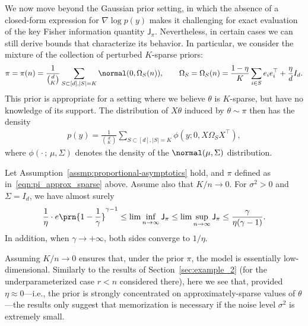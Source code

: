 \documentclass[11pt]{article}
\newcommand{\jfunc}{\mathsf{J}}
\begin{document}
We now move beyond the Gaussian prior setting, in which the absence of a closed-form expression for $\nabla \log p(y)$ makes it challenging for exact evaluation of the key Fisher information quantity $\jfunc_\pi$. Nevertheless, in certain cases we can still derive bounds that characterize its behavior. In particular, we consider the mixture of the collection of perturbed $K$-sparse priors:
\begin{align}\label{eqn:pi_approx_sparse}
    \pi = \pi(n) = \frac{1}{\binom{d}{K}} \sum_{S \subset [d], |S|=K} \normal(0, \Omega_S(n)), \qquad \Omega_S = \Omega_S(n) = \frac{1-\eta}{K}\sum_{i \in S} e_ie_i^\top + \frac{\eta}{d} I_d.
\end{align}
This prior is appropriate for a setting where we believe $\theta$ is $K$-sparse, but have no knowledge of its support. The distribution of $X\theta$ induced by $\theta \sim \pi$ then has the density
\begin{align*}
    p(y) = \frac{1}{\binom{d}{K}} \sum_{S \subset [d], |S|=K} \phi(y; 0, X \Omega_S X^\top),
\end{align*}
where $\phi(\cdot \, ; \, \mu, \Sigma)$ denotes the density of the $\normal(\mu,\Sigma)$ distribution. 


\begin{proposition} \label{prop:applications-perturbed-sparse} Let Assumption~\ref{assmp:proportional-asymptotics} hold, and $\pi$ defined as in~\eqref{eqn:pi_approx_sparse} above. Assume also that $K/n \to 0$. For $\sigma^2 > 0$ and $\Sigma = I_d$, we have almost surely
\[\frac{1}{\eta} \cdot e \prn{1-\frac{1}{\gamma}}^{\gamma - 1} \leq \lim\inf_{n\to\infty} \jfunc_\pi \leq \lim\sup_{n\to\infty} \jfunc_\pi \leq \frac{\gamma}{\eta(\gamma-1)}.\]
In addition, when $\gamma \to +\infty$, both sides converge to $1/\eta$.
\end{proposition}


Assuming $K/n\to 0$ ensures that, under the prior $\pi$, the model is essentially low-dimensional. Similarly to the results of Section~\ref{sec:example_2} (for the underparameterized case $r<n$ considered there), here we see that, provided $\eta\approx 0$---i.e., the prior is strongly concentrated on approximately-sparse values of $\theta$---the results only suggest that memorization is necessary if the noise level $\sigma^2$ is extremely small.
\end{document}
